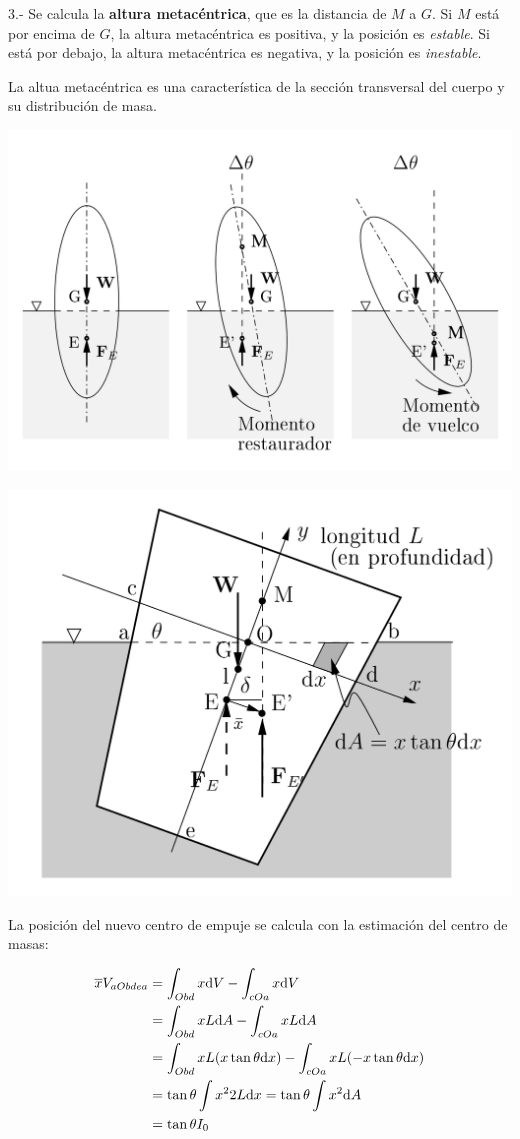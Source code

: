 3.- Se calcula la \textbf{altura metacéntrica}, que es la distancia de $M$ a $G$. Si $M$ está por encima de $G$, la altura metacéntrica  es positiva, y la posición es \emph{estable}. Si está por debajo, la altura metacéntrica es negativa, y la posición es \emph{inestable}.

La altua metacéntrica es una característica de la sección transversal del cuerpo y su distribución de masa.

\begin{center}
	\includegraphics[width=0.7\linewidth]{TeX_files/chapter02-Hidrostatica/estabilidad4}
\end{center}

\begin{center}
	\includegraphics[width=0.7\linewidth]{TeX_files/chapter02-Hidrostatica/estabilidad5}
\end{center}




	La posición del nuevo centro de empuje se calcula con la estimación del centro de masas:

\begin{align*}
	\overline{x}V_{aObdea} &= \int_{Obd}x \text{d} V - \int_{cOa} x \text{d} V
\\
	&= \int_{Obd} x L \text{d} A - \int_{cOa} x L \text{d} A 
\\
	&= \int_{Obd} x L (x\tan \theta \text{d} x) - \int_{cOa} x L  (-x\tan \theta \text{d} x)
\\
	&= \tan \theta \int x^2 2 L \text{d} x = \tan \theta \int x^2 \text{d} A 
	\\
	&= \tan \theta I_0
\end{align*}



